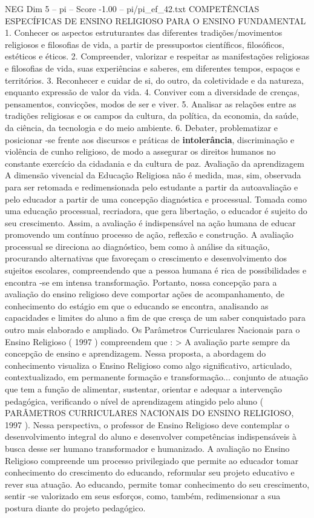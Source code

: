 \begin{textsample}{NEG Dim 5 – pi – Score -1.00 – pi/pi\_ef\_42.txt}  \label{ex:f5_neg_055}
COMPETÊNCIAS ESPECÍFICAS DE ENSINO RELIGIOSO PARA O ENSINO FUNDAMENTAL 1.
Conhecer os aspectos estruturantes das diferentes tradições/movimentos religiosos e filosofias de vida, a partir de pressupostos científicos, filosóficos, estéticos e éticos. 2.
Compreender, valorizar e respeitar as manifestações religiosas e filosofias de vida, suas experiências e saberes, em diferentes tempos, espaços e territórios. 3.
Reconhecer e cuidar de si, do outro, da coletividade e da natureza, enquanto expressão de valor da vida. 4.
Conviver com a diversidade de crenças, pensamentos, convicções, modos de ser e viver. 5.
Analisar as relações entre as tradições religiosas e os campos da cultura, da política, da economia, da saúde, da ciência, da tecnologia e do meio ambiente. 6.
Debater, problematizar e posicionar -se frente aos discursos e práticas de \textbf{intolerância}, discriminação e violência de cunho religioso, de modo a assegurar os direitos humanos no constante exercício da cidadania e da cultura de paz.
Avaliação da aprendizagem A dimensão vivencial da Educação Religiosa não é medida, mas, sim, observada para ser retomada e redimensionada pelo estudante a partir da autoavaliação e pelo educador a partir de uma concepção diagnóstica e processual.
Tomada como uma educação processual, recriadora, que gera libertação, o educador é sujeito do seu crescimento.
Assim, a avaliação é indispensável na ação humana de educar promovendo um contínuo processo de ação, reflexão e construção.
A avaliação processual se direciona ao diagnóstico, bem como à análise da situação, procurando alternativas que favoreçam o crescimento e desenvolvimento dos sujeitos escolares, compreendendo que a pessoa humana é rica de possibilidades e encontra -se em intensa transformação.
Portanto, nossa concepção para a avaliação do ensino religioso deve comportar ações de acompanhamento, de conhecimento do estágio em que o educando se encontra, analisando as capacidades e limites do aluno a fim de que cresça de um saber conquistado para outro mais elaborado e ampliado.
Os Parâmetros Curriculares Nacionais para o Ensino Religioso ( 1997 ) compreendem que : > A avaliação parte sempre da concepção de ensino e aprendizagem.
Nessa proposta, a abordagem do conhecimento visualiza o Ensino Religioso como algo significativo, articulado, contextualizado, em permanente formação e transformação... conjunto de atuação que tem a função de alimentar, sustentar, orientar e adequar a intervenção pedagógica, verificando o nível de aprendizagem atingido pelo aluno ( PARÂMETROS CURRICULARES NACIONAIS DO ENSINO RELIGIOSO, 1997 ).
Nessa perspectiva, o professor de Ensino Religioso deve contemplar o desenvolvimento integral do aluno e desenvolver competências indispensáveis à busca desse ser humano transformador e humanizado.
A avaliação no Ensino Religioso compreende um processo privilegiado que permite ao educador tomar conhecimento do crescimento do educando, reformular seu projeto educativo e rever sua atuação.
Ao educando, permite tomar conhecimento do seu crescimento, sentir -se valorizado em seus esforços, como, também, redimensionar a sua postura diante do projeto pedagógico.

\end{textsample}
